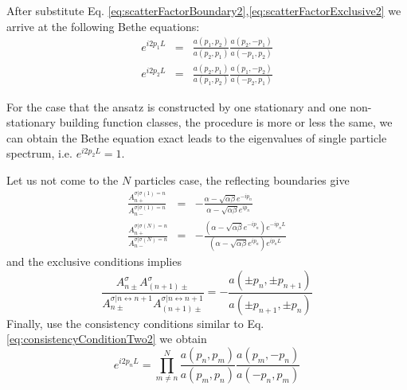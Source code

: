 \documentclass[aps,showpacs,twocolumn,floatfix,prx,superscriptaddress]{revtex4-1}
\begin{document}
After substitute Eq. \eqref{eq:scatterFactorBoundary2},\eqref{eq:scatterFactorExclusive2} we arrive at the following Bethe equations:
\begin{subequations}
    \label{eq:betheEqTwo2}
    \begin{eqnarray}
        e^{i2p_1L} & = & \frac{a(p_1, p_2)}{a(p_2, p_1)} 
        \frac{a(p_2, -p_1)}{a(-p_1, p_2)}\\
        e^{i2p_2L} & = & \frac{a(p_2, p_1)}{a(p_1, p_2)} 
        \frac{a(p_1, -p_2)}{a(-p_2, p_1)}
    \end{eqnarray}
\end{subequations}

For the case that the ansatz is constructed by one stationary and one non-stationary building function classes, the procedure is more or less the same, we can obtain the Bethe equation exact leads to the eigenvalues of single particle spectrum, i.e. $e^{i2p_2 L} = 1$. 

Let us not come to the $N$ particles case, the reflecting boundaries give
\begin{subequations}
    \label{eq:scatterFactorBoundaryN}
    \begin{eqnarray}
        \frac{A_{n+}^{\sigma|\sigma(1)=n}}{A_{n-}^{\sigma|\sigma(1)=n}} & = &
        -\frac{\alpha-\sqrt{\alpha\beta}
            e^{-ip_{n}}}{\alpha-\sqrt{\alpha\beta} e^{ip_{n}}}
        \\ \frac{A_{n+}^{\sigma|\sigma(N)=n}}{A_{n-}^{\sigma|\sigma(N)=n}} & = &
        -\frac{\left(\alpha-\sqrt{\alpha\beta} e^{-ip_{n}}\right)
            e^{-ip_{n}L}}{\left(\alpha-\sqrt{\alpha\beta}
                e^{ip_{n}}\right) e^{ip_{n}L}}
    \end{eqnarray}
\end{subequations}
and the exclusive conditions implies
\begin{equation}
    \label{eq:scatterFactorExclusiveN}
        \frac{A_{n\pm}^{\sigma}A_{(n+1)\pm}^{\sigma}}{A_{n\pm}^{\sigma|
                n\leftrightarrow n+1}A_{(n+1)\pm}^{\sigma|n\leftrightarrow n+1}}
        =  -\frac{a(\pm p_{n},\pm p_{n+1})}{a(\pm p_{n+1}, \pm p_{n})} 
\end{equation}
Finally, use the consistency conditions similar to Eq. \eqref{eq:consistencyConditionTwo2} we obtain
\begin{equation}
    \label{eq:betheEqN}
    e^{i2p_nL}  =  \prod_{m\neq n}^N\frac{a(p_n, p_m)}{a(p_m, p_n)} 
    \frac{a(p_m, -p_n)}{a(-p_n, p_m)}
\end{equation}
\end{document}

